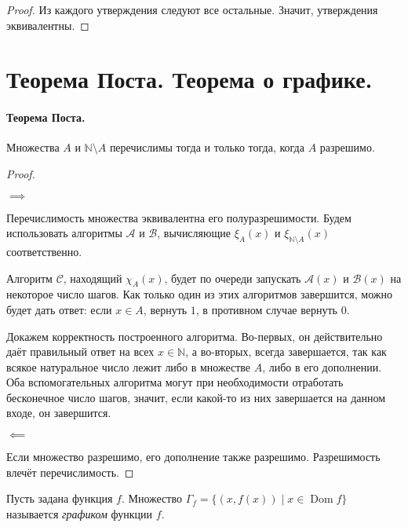 \documentclass{article}
\begin{document}
\begin{proof}
        Из каждого утверждения следуют все остальные. Значит, утверждения эквивалентны.
    \end{proof}

    \section{Теорема Поста. Теорема о графике.}

    \paragraph{Теорема Поста.} \label{Post} Множества $A$ и $\mathbb{N} \setminus A$ перечислимы
    тогда и только тогда, когда $A$ разрешимо.

    \begin{proof} \

        $\implies$

        Перечислимость множества эквивалентна его полуразрешимости. Будем использовать алгоритмы
        $\mathcal{A}$ и $\mathcal{B}$, вычисляющие $\xi_{A}(x)$ и $\xi_{\mathbb{N} \setminus A}(x)$
        соответственно.

        Алгоритм $\mathcal{C}$, находящий $\chi_A(x)$, будет по очереди запускать $\mathcal{A}(x)$ и
        $\mathcal{B}(x)$ на некоторое число шагов. Как только один из этих алгоритмов завершится, можно
        будет дать ответ: если $x \in A$, вернуть $1$, в противном случае вернуть $0$.

        Докажем корректность построенного алгоритма. Во-первых, он действительно даёт правильный
        ответ на всех $x \in \mathbb{N}$, а во-вторых, всегда завершается, так как всякое
        натуральное число лежит либо в множестве $A$, либо в его дополнении. Оба вспомогательных
        алгоритма могут при необходимости отработать бесконечное число шагов, значит, если какой-то
        из них завершается на данном входе, он завершится.

        $\impliedby$

        Если множество разрешимо, его дополнение также разрешимо. Разрешимость влечёт
        перечислимость.
    \end{proof}

    \begin{definition}
        Пусть задана функция $f$. Множество $\Gamma_f = \{(x, f(x)) \mid x \in \operatorname{Dom} f\}$
        называется \textit{графиком} функции $f$.
    \end{definition}
\end{document}
